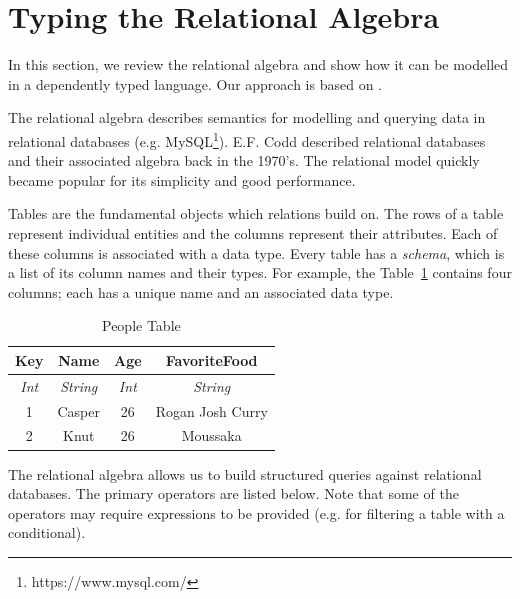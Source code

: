 \documentclass[12pt]{article}
\begin{document}
\section{Typing the Relational Algebra}\label{sec:typing_the_relational_algebra}

In this section, we review the relational algebra and show how it can be modelled in a dependently typed language.
Our approach is based on \cite{OurySwierstra08PowerOfPi}.

The relational algebra describes semantics for modelling and querying data in relational databases (e.g. MySQL\footnote{https://www.mysql.com/}).
E.F. Codd described relational databases and their associated algebra back in the 1970's\cite{codd70}.
The relational model quickly became popular for its simplicity and good performance.

Tables are the fundamental objects which relations build on.
The rows of a table represent individual entities and the columns represent their attributes.
Each of these columns is associated with a data type.
Every table has a \textit{schema}, which is a list of its column names and their types.
For example, the Table~\ref{tab:people_table} contains four columns; each has a unique name and an associated data type.

\begin{table}[tb]
    \caption{People Table}
    \label{tab:people_table}
    \centering

    \begin{tabular}{|c|c|c|c|}
    \hline

    \hline
    \textbf{Key} & \textbf{Name} & \textbf{Age} & \textbf{FavoriteFood} \\
    \hline
    \textit{Int} & \textit{String} & \textit{Int} & \textit{String} \\
    \hline
    \hline
       1 & Casper & 26 & Rogan Josh Curry \\
       2 & Knut & 26 & Moussaka \\
    \hline

    \end{tabular}
\end{table}

The relational algebra allows us to build structured queries against relational databases.
The primary operators are listed below.
Note that some of the operators may require expressions to be provided (e.g. for filtering a table with a conditional).
\end{document}
